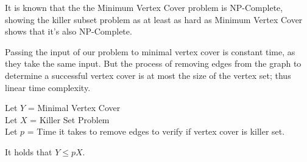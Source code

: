 \documentclass[10pt]{article}
\begin{document}
\begin{question}
\begin{enumerate}[a)]
            It is known that the the Minimum Vertex Cover problem is NP-Complete, showing the killer subset problem as at least as hard as Minimum Vertex Cover shows that it's also NP-Complete.
            
            Passing the input of our problem to minimal vertex cover is constant time, as they take the same input. But the process of removing edges from the graph to determine a successful vertex cover is at most the size of the vertex set; thus linear time complexity.
            
            Let $Y$ = Minimal Vertex Cover \\
            Let $X$ = Killer Set Problem \\
            Let $p$ = Time it takes to remove edges to verify if vertex cover is killer set.
            
            It holds that $Y \leq pX$.
    \end{enumerate}
    \begin{thebibliography}{3}
        \bibitem{}
        \bibitem{}
        \bibitem{}
        \bibitem{}
        \bibitem{}
    \end{thebibliography}
\end{question}
\end{document}
